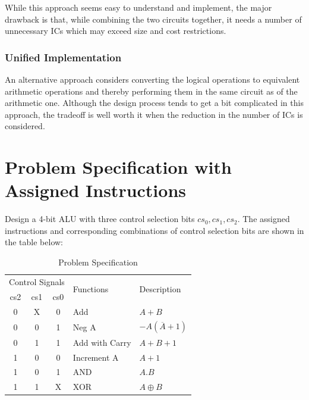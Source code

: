 \documentclass{article}
\begin{document}
While this approach seems easy to understand and implement, the major drawback is that, while combining the two circuits together, it needs a number of unnecessary ICs which may exceed size and cost restrictions.

\subsubsection{Unified Implementation}

An alternative approach considers converting the logical operations to equivalent arithmetic operations and thereby performing them in the same circuit as of the arithmetic one. Although the design process tends to get a bit complicated in this approach, the tradeoff is well worth it when the reduction in the number of ICs is considered.


\vspace{2cm}


\section{\large{Problem Specification with Assigned Instructions}}
Design a 4-bit ALU with three control selection bits $cs_0, cs_1, cs_2$. The assigned instructions and corresponding combinations of control selection bits are shown in the table below:
\begin{table}[h]
    \centering
    \begin{tabular}{||c|c|c|l|l||}
    \hline
         \multicolumn{3}{||c|}{Control Signals} & \multirow{2}{*}{Functions} & \multirow{2}{*}{Description}\\
         \cline{1-3}
         cs2 & cs1 & cs0 & & \\
         \hline
         \hline
         0 & X & 0 & Add & $A + B$ \\
         0 & 0 & 1 & Neg A & $-A(\overline{A}+1)$ \\
         0 & 1 & 1 & Add with Carry & $A + B + 1$\\
         1 & 0 & 0 & Increment A & $A + 1$\\
         1 & 0 & 1 & AND & $A . B$\\
         1 & 1 & X & XOR & $A \oplus B$\\
         \hline
    \end{tabular}
    \caption{Problem Specification}
    \label{tab:Table1}
\end{table}
\vspace{15mm}
\end{document}
